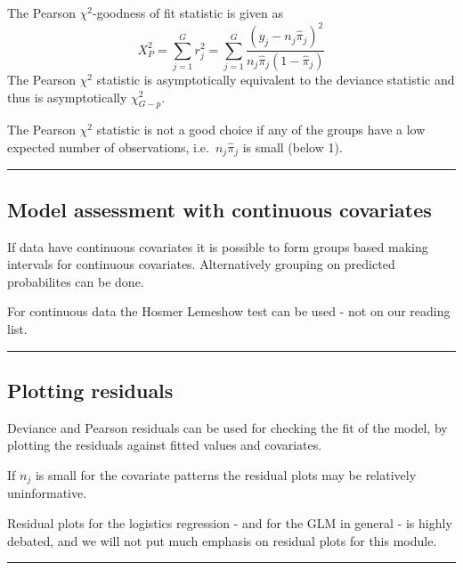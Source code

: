 \documentclass[
]{article}
\begin{document}
The Pearson \(\chi^2\)-goodness of fit statistic is given as
\[ X_P^2=\sum_{j=1}^G r_j^2=\sum_{j=1}^G  \frac{(y_j-n_j\hat{\pi}_j)^2}{n_j \hat{\pi}_j(1-\hat{\pi}_j)}\]
The Pearson \(\chi^2\) statistic is asymptotically equivalent to the
deviance statistic and thus is asymptotically \(\chi^2_{G-p}\).

The Pearson \(\chi^2\) statistic is not a good choice if any of the
groups have a low expected number of observations,
i.e.~\(n_j \hat{\pi}_j\) is small (below 1).

\begin{center}\rule{0.5\linewidth}{0.5pt}\end{center}

\hypertarget{model-assessment-with-continuous-covariates}{%
\subsection{Model assessment with continuous
covariates}\label{model-assessment-with-continuous-covariates}}

If data have continuous covariates it is possible to form groups based
making intervals for continuous covariates. Alternatively grouping on
predicted probabilites can be done.

For continuous data the Hosmer Lemeshow test can be used - not on our
reading list.

\begin{center}\rule{0.5\linewidth}{0.5pt}\end{center}

\hypertarget{plotting-residuals}{%
\subsection{Plotting residuals}\label{plotting-residuals}}

Deviance and Pearson residuals can be used for checking the fit of the
model, by plotting the residuals against fitted values and covariates.

If \(n_j\) is small for the covariate patterns the residual plots may be
relatively uninformative.

Residual plots for the logistics regression - and for the GLM in general
- is highly debated, and we will not put much emphasis on residual plots
for this module.

\begin{center}\rule{0.5\linewidth}{0.5pt}\end{center}
\end{document}
